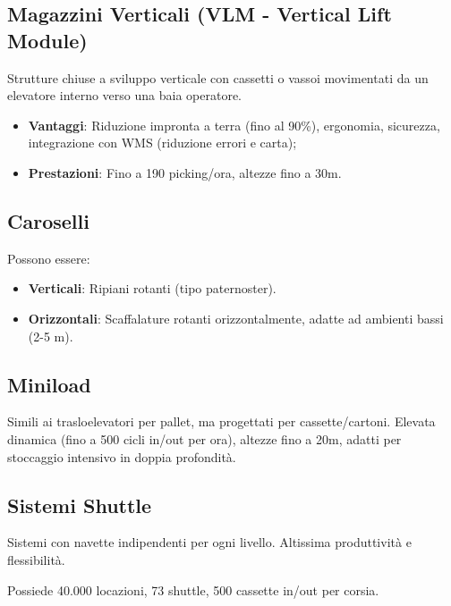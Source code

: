 \subsection{Magazzini Verticali (VLM - Vertical Lift Module)}
Strutture chiuse a sviluppo verticale con cassetti o vassoi movimentati da un elevatore interno verso una baia operatore.
\begin{itemize}
    \item \textbf{Vantaggi}: Riduzione impronta a terra (fino al 90\%), ergonomia, sicurezza, integrazione con WMS (riduzione errori e carta);
    \item \textbf{Prestazioni}: Fino a 190 picking/ora, altezze fino a 30m.
\end{itemize}
%
\subsection{Caroselli}
Possono essere:
\begin{itemize}
    \item \textbf{Verticali}: Ripiani rotanti (tipo paternoster).
    \item \textbf{Orizzontali}: Scaffalature rotanti orizzontalmente, adatte ad ambienti bassi (2-5 m).
\end{itemize}
%
\subsection{Miniload}
Simili ai trasloelevatori per pallet, ma progettati per cassette/cartoni. Elevata dinamica (fino a 500 cicli in/out per ora), altezze fino a 20m, adatti per stoccaggio intensivo in doppia profondità.
%
\subsection{Sistemi Shuttle}
Sistemi con navette indipendenti per ogni livello. Altissima produttività e flessibilità.
\begin{example}
    Possiede 40.000 locazioni, 73 shuttle, 500 cassette in/out per corsia.
\end{example}


